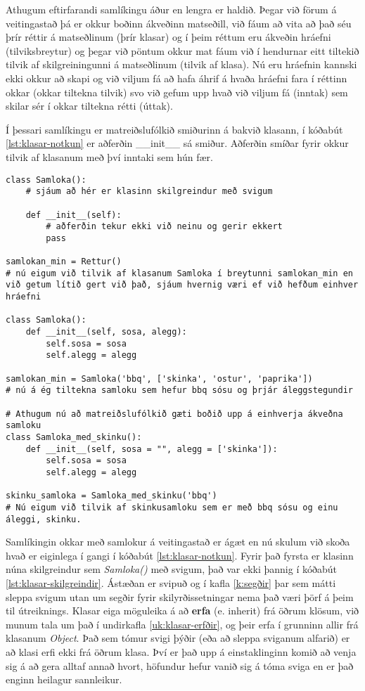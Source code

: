Athugum eftirfarandi samlíkingu áður en lengra er haldið.
Þegar við förum á veitingastað þá er okkur boðinn ákveðinn matseðill, við fáum að vita að það séu þrír réttir á matseðlinum (þrír klasar) og í þeim réttum eru ákveðin hráefni (tilviksbreytur) og þegar við pöntum okkur mat fáum við í hendurnar eitt tiltekið tilvik af skilgreiningunni á matseðlinum (tilvik af klasa).
Nú eru hráefnin kannski ekki okkur að skapi og við viljum fá að hafa áhrif á hvaða hráefni fara í réttinn okkar (okkar tiltekna tilvik) svo við gefum upp hvað við viljum fá (inntak) sem skilar sér í okkar tiltekna rétti (úttak).

Í þessari samlíkingu er matreiðslufólkið smiðurinn á bakvið klasann, í kóðabút \ref{lst:klasar-notkun} er aðferðin \_\_init\_\_ sá smiður.
Aðferðin smíðar fyrir okkur tilvik af klasanum með því inntaki sem hún fær.

\begin{lstlisting}[caption=Klasar skilgreindir með töfraaðferðinni \_\_init\_\_, label=lst:klasar-notkun]
class Samloka():
	# sjáum að hér er klasinn skilgreindur með svigum
	
	def __init__(self):
		# aðferðin tekur ekki við neinu og gerir ekkert
		pass
	
samlokan_min = Rettur()
# nú eigum við tilvik af klasanum Samloka í breytunni samlokan_min en við getum lítið gert við það, sjáum hvernig væri ef við hefðum einhver hráefni

class Samloka():
	def __init__(self, sosa, alegg):
		self.sosa = sosa
		self.alegg = alegg
		
samlokan_min = Samloka('bbq', ['skinka', 'ostur', 'paprika'])
# nú á ég tiltekna samloku sem hefur bbq sósu og þrjár áleggstegundir

# Athugum nú að matreiðslufólkið gæti boðið upp á einhverja ákveðna samloku
class Samloka_med_skinku():
	def __init__(self, sosa = "", alegg = ['skinka']):
		self.sosa = sosa
		self.alegg = alegg
		
skinku_samloka = Samloka_med_skinku('bbq')
# Nú eigum við tilvik af skinkusamloku sem er með bbq sósu og einu áleggi, skinku.
\end{lstlisting}

Samlíkingin okkar með samlokur á veitingastað er ágæt en nú skulum við skoða hvað er eiginlega í gangi í kóðabút \ref{lst:klasar-notkun}.
Fyrir það fyrsta er klasinn núna skilgreindur sem \textit{Samloka()} með svigum, það var ekki þannig í kóðabút \ref{lst:klasar-skilgreindir}.
Ástæðan er svipuð og í kafla \ref{k:segðir} þar sem mátti sleppa svigum utan um segðir fyrir skilyrðissetningar nema það væri þörf á þeim til útreiknings.
Klasar eiga möguleika á að \textbf{erfa} (e. inherit) frá öðrum klösum, við munum tala um það í undirkafla \ref{uk:klasar-erfðir}, og þeir erfa í grunninn allir frá klasanum \textit{Object}.
Það sem tómur svigi þýðir (eða að sleppa sviganum alfarið) er að klasi erfi ekki frá öðrum klasa.
Því er það upp á einstaklinginn komið að venja sig á að gera alltaf annað hvort, höfundur hefur vanið sig á tóma sviga en er það enginn heilagur sannleikur.

